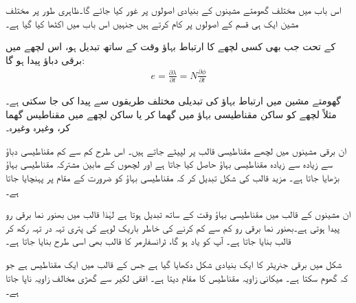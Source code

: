 اس باب میں مختلف گھومتے مشینوں کے بنیادی اصولوں پر غور کیا جائے گا۔ظاہری طور پر مختلف مشین ایک ہی قسم کے اصولوں پر کام کرتے ہیں جنہیں اس باب میں اکٹھا کیا گیا ہے۔

 کے تحت جب بھی کسی لچھے کا ارتباط بہاؤ   وقت کے ساتھ تبدیل ہو، اس لچھے میں برقی دباؤ پیدا ہو گا:
\begin{align}
e=\frac{\partial \lambda}{\partial t}=N \frac{\partial \phi}{\partial t}
\end{align}

گھومتے مشین میں ارتباط بہاؤ کی تبدیلی مختلف طریقوں سے پیدا کی جا سکتی ہے۔مثلاً  لچھے کو ساکن مقناطیسی بہاؤ میں گھما کر یا  ساکن لچھے میں مقناطیس گھما کر، وغیرہ وغیرہ۔

ان برقی مشینوں میں لچھے مقناطیسی قالب  پر لپیٹے جاتے ہیں۔ اس طرح کم سے کم مقناطیسی دباؤ سے زیادہ سے زیادہ مقناطیسی بہاؤ حاصل کیا جاتا ہے اور لچھوں کے مابین مشترکہ مقناطیسی بہاؤ بڑھایا جاتا ہے۔ مزید قالب کی شکل تبدیل کر کہ مقناطیسی بہاؤ کو ضرورت کے مقام پر پہنچایا جاتا ہے۔

ان مشینوں کے قالب میں مقناطیسی بہاؤ وقت کے ساتھ تبدیل ہوتا ہے لہٰذا قالب میں بھنور نما برقی رو پیدا ہوتی ہے۔بھنور نما برقی رو  کم سے کم کرنے کی خاطر  باریک لوہے کی پتری تہہ در تہہ رکھ کر  قالب بنایا جاتا ہے۔   آپ کو یاد ہو گا، ٹرانسفارمر کا قالب بھی اسی طرح بنایا جاتا ہے۔

شکل   میں  برقی جنریٹر کا ایک بنیادی شکل دکھایا گیا ہے جس کے قالب میں ایک مقناطیس ہے جو کہ گھوم سکتا ہے۔   میکانی زاویہ  مقناطیس کا مقام دیتا ہے۔ افقی لکیر سے گھڑی مخالف  زاویہ  ناپا جاتا ہے۔

